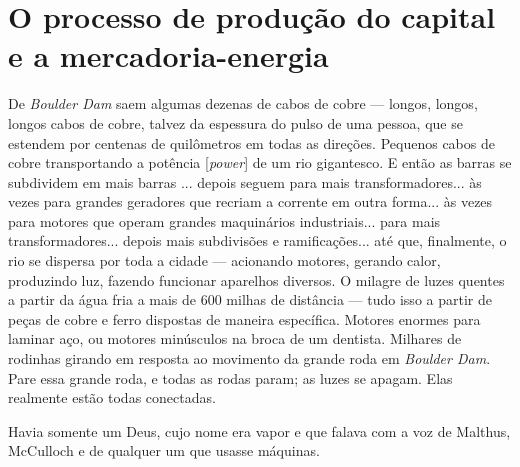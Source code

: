 
\chapter{O processo de produção do capital e a mercadoria-energia}
\setlength{\epigraphwidth}{0.7\textwidth}

\epigraph{De \textit{Boulder Dam} saem algumas dezenas de cabos de cobre — longos, longos, longos cabos de cobre, talvez da espessura do pulso de uma pessoa, que se estendem por centenas de quilômetros em todas as direções. Pequenos cabos de cobre transportando a potência [\textit{power}] de um rio gigantesco. E então as barras se subdividem em mais barras ... depois seguem para mais transformadores... às vezes para grandes geradores que recriam a corrente em outra forma... às vezes para motores que operam grandes maquinários industriais... para mais transformadores... depois mais subdivisões e ramificações... até que, finalmente, o rio se dispersa por toda a cidade --- acionando motores, gerando calor, produzindo luz, fazendo funcionar aparelhos diversos. O milagre de luzes quentes a partir da água fria a mais de 600 milhas de distância --- tudo isso a partir de peças de cobre e ferro dispostas de maneira específica. Motores enormes para laminar aço, ou motores minúsculos na broca de um dentista. Milhares de rodinhas girando em resposta ao movimento da grande roda em \textit{Boulder Dam}. Pare essa grande roda, e todas as rodas param; as luzes se apagam. Elas realmente estão todas conectadas.}{\textcite[Cap. 16]{Feynman2006}}


\epigraph{Havia somente um Deus, cujo nome era vapor e que falava com a voz de Malthus, McCulloch e de qualquer um que usasse máquinas.} {\textcite[p. 294]{Hobsbawm2014}}

